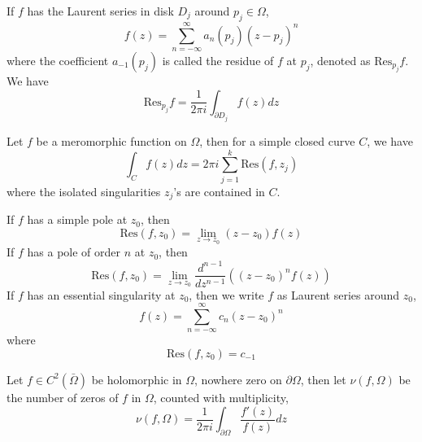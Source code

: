 \documentclass[openany]{book}
\begin{document}
\begin{defn}
    If $f$ has the Laurent series in disk $D_j$ around $p_j\in\Omega$,
    \begin{equation*}
        f(z)=\sum_{n=-\infty}^\infty a_n(p_j)(z-p_j)^n
    \end{equation*}
    where the coefficient $a_{-1}(p_j)$ is called the residue of $f$ at $p_j$, denoted as $\text{Res}_{p_j}f$. We have 
    \begin{equation*}
        \text{Res}_{p_j}f=\frac{1}{2\pi i}\int_{\partial D_j}f(z)dz
    \end{equation*} 

\end{defn}


\begin{prop}
    Let $f$ be a meromorphic function on $\Omega$, then for a simple closed curve $C$, we have 
    \begin{equation*}
        \int_Cf(z)dz=2\pi i\sum_{j=1}^k\text{Res}(f,z_j)
    \end{equation*}
    where the isolated singularities $z_j$'s are contained in $C$.
\end{prop}


\begin{prop}[Residue]
    If $f$ has a simple pole at $z_0$, then 
    \begin{equation*}
        \text{Res}(f,z_0)=\lim_{z\to z_0}(z-z_0)f(z)
    \end{equation*}
    If $f$ has a pole of order $n$ at $z_0$, then
    \begin{equation*}
        \text{Res}(f,z_0)=\lim_{z\to z_0}\frac{d^{n-1}}{dz^{n-1}}\left((z-z_0)^nf(z)\right)
    \end{equation*}
    If $f$ has an essential singularity at $z_0$, then we write $f$ as Laurent series around $z_0$,
    \begin{equation*}
        f(z)=\sum_{n=-\infty}^\infty c_n(z-z_0)^n
    \end{equation*}
    where 
    \begin{equation*}
        \text{Res}(f,z_0)=c_{-1}
    \end{equation*}
\end{prop}

\begin{prop}
    Let $f\in C^2(\bar{\Omega})$ be holomorphic in $\Omega$, nowhere zero on $\partial\Omega$, then let $\nu(f,\Omega)$ be the number of zeros of $f$ in $\Omega$, counted with multiplicity, 
    \begin{equation*}
        \nu(f,\Omega)=\frac{1}{2\pi i}\int_{\partial\Omega}\frac{f'(z)}{f(z)}dz
    \end{equation*}
\end{prop}
\end{document}
